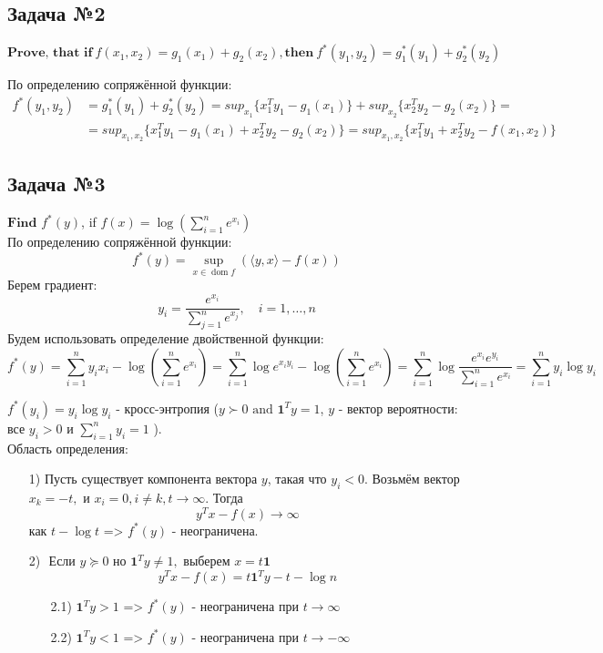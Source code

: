 \documentclass[12pt,letterpaper]{article}
\begin{document}
\subsection*{Задача №2}
$\textbf{Prove, that if}\ f(x_1,x_2)=g_1(x_1)+g_2(x_2), \textbf{then}\ f^*(y_1,y_2)=g^*_1(y_1)+g^*_2(y_2)$

По определению сопряжённой функции: 
$$
\begin{aligned}
f^*(y_1,y_2)&=g^*_1(y_1)+g^*_2(y_2)= sup_{x_1}\{x^T_1y_1-g_1(x_1)\}+sup_{x_2}\{x^T_2y_2-g_2(x_2)\}=\\
&=sup_{x_1,x_2}\{x^T_1y_1-g_1(x_1)+x^T_2y_2-g_2(x_2)\}=sup_{x_1,x_2}\{x^T_1y_1+x^T_2y_2-f(x_1,x_2)\}
\end{aligned}
$$

\subsection*{Задача №3}
$\textbf{Find}$ $f^* (y)$, if $ f(x) = \log \left( \sum\limits_{i=1}^n e^{x_i} \right) $ \\

По определению сопряжённой функции: 
$$
f^{*}(y)=\sup _{x \in \operatorname{dom} f}(\langle y, x\rangle-f(x))
$$
Берем градиент: 
$$
y_{i}=\frac{e^{x_{i}}}{\sum_{j=1}^{n} e^{x_{j}}}, \quad i=1, \ldots, n
$$
Будем использовать определение двойственной функции:
$$
f^*(y) = \sum\limits_{i=1}^n y_i x_i - \log \left( \sum\limits_{i=1}^n e^{x_i} \right) = \sum\limits_{i=1}^n \log e^{x_i y_i} - \log \left( \sum\limits_{i=1}^n e^{x_i} \right) = \sum\limits_{i=1}^n
 \log  \frac {e^{x_i} e^{y_i} }{ \sum\limits_{i=1}^n e^{x_i} } = \sum\limits_{i=1}^n y_i \log y_i
$$

$ f^*(y_i) = y_i \log y_i $ - кросс-энтропия ($y \succ 0 \text { and } \mathbf{1}^{T} y=1$, $ y $ - вектор вероятности: все $ y_i > 0 $ и $ \sum \limits_{i = 1}^n y_i = 1 $  ). \\
Область определения: 
\begin{itemize}
\item[1)] Пусть существует компонента вектора $ y $, такая что $ y_i < 0 $. Возьмём вектор $x_{k}=-t, \text { и } x_{i}=0, i \neq k, t\rightarrow \infty$. Тогда $$ y^{T} x-f(x) \rightarrow\infty$$ как $ t - \log t $ => $ f^*(y) $ - неограничена. 
\item[2)] $ \text { Если } y \succeq 0 \text { но } \mathbf{1}^{T} y \neq 1, \text { выберем } x=t \mathbf{1}$
$$
y^{T} x-f(x)=t \mathbf{1}^{T} y-t-\log n
$$
\begin{itemize}
	\item[2.1)] $ \mathbf{1}^{T} y > 1 $ => $ f^*(y) $ - неограничена при $ t \rightarrow \infty $
	\item[2.2)] $ \mathbf{1}^{T} y < 1 $ =>  $ f^*(y) $ - неограничена при $ t \rightarrow -\infty $
\end{itemize}
\end{itemize}
\end{document}

